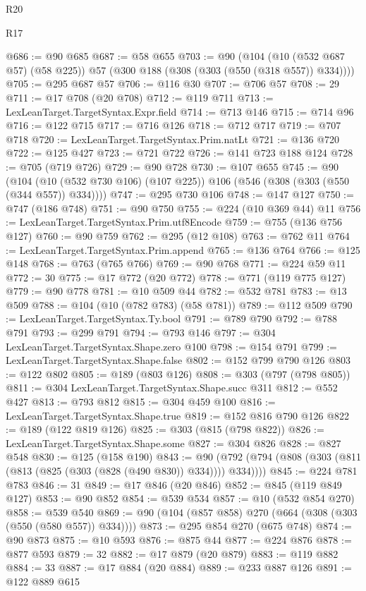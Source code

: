 \begin{lexlean}{R20}
\begin{lexlean}{R17}
\begin{coremodule}
{{{{{{{{{{{{{{{{{{{{{{{{{{{{{{{{{{{{{{{{{{{{{{{{{{{{{{{{{{{{{{{{{{{{{{{{{{{{{{{{{{{{{{{{{{{{{{{{{{{{{{{{{{{@686 := @90 @685
@687 := @58 @655
@703 := @90
    (@104 (@10 (@532 @687 @57) (@58 @225)) @57 (@300 @188 (@308 (@303 (@550 (@318 @557)) @334))))
@705 := @295 @687 @57
@706 := @116 @30
@707 := @706 @57
@708 := 29
@711 := @17 @708 (@20 @708)
@712 := @119 @711
@713 := LexLeanTarget.TargetSyntax.Expr.field
@714 := @713 @146
@715 := @714 @96
@716 := @122 @715
@717 := @716 @126
@718 := @712 @717
@719 := @707 @718
@720 := LexLeanTarget.TargetSyntax.Prim.natLt
@721 := @136 @720
@722 := @125 @427
@723 := @721 @722
@726 := @141 @723 @188 @124
@728 := @705 (@719 @726)
@729 := @90 @728
@730 := @107 @655
@745 := @90
    (@104 (@10 (@532 @730 @106) (@107 @225)) @106 (@546 (@308 (@303 (@550 (@344 @557)) @334))))
@747 := @295 @730 @106
@748 := @147 @127
@750 := @747 (@186 @748)
@751 := @90 @750
@755 := @224 (@10 @369 @44) @11
@756 := LexLeanTarget.TargetSyntax.Prim.utf8Encode
@759 := @755 (@136 @756 @127)
@760 := @90 @759
@762 := @295 (@12 @108)
@763 := @762 @11
@764 := LexLeanTarget.TargetSyntax.Prim.append
@765 := @136 @764
@766 := @125 @148
@768 := @763 (@765 @766)
@769 := @90 @768
@771 := @224 @59 @11
@772 := 30
@775 := @17 @772 (@20 @772)
@778 := @771 (@119 @775 @127)
@779 := @90 @778
@781 := @10 @509 @44
@782 := @532 @781
@783 := @13 @509
@788 := @104 (@10 (@782 @783) (@58 @781))
@789 := @112 @509
@790 := LexLeanTarget.TargetSyntax.Ty.bool
@791 := @789 @790
@792 := @788 @791
@793 := @299 @791
@794 := @793 @146
@797 := @304 LexLeanTarget.TargetSyntax.Shape.zero @100
@798 := @154 @791
@799 := LexLeanTarget.TargetSyntax.Shape.false
@802 := @152 @799 @790 @126
@803 := @122 @802
@805 := @189 (@803 @126)
@808 := @303 (@797 (@798 @805))
@811 := @304 LexLeanTarget.TargetSyntax.Shape.succ @311
@812 := @552 @427
@813 := @793 @812
@815 := @304 @459 @100
@816 := LexLeanTarget.TargetSyntax.Shape.true
@819 := @152 @816 @790 @126
@822 := @189 (@122 @819 @126)
@825 := @303 (@815 (@798 @822))
@826 := LexLeanTarget.TargetSyntax.Shape.some
@827 := @304 @826
@828 := @827 @548
@830 := @125 (@158 @190)
@843 := @90 (@792 (@794 (@808 (@303 (@811 (@813 (@825 (@303 (@828 (@490 @830)) @334)))) @334))))
@845 := @224 @781 @783
@846 := 31
@849 := @17 @846 (@20 @846)
@852 := @845 (@119 @849 @127)
@853 := @90 @852
@854 := @539 @534
@857 := @10 (@532 @854 @270)
@858 := @539 @540
@869 := @90 (@104 (@857 @858) @270 (@664 (@308 (@303 (@550 (@580 @557)) @334))))
@873 := @295 @854 @270 (@675 @748)
@874 := @90 @873
@875 := @10 @593
@876 := @875 @44
@877 := @224 @876
@878 := @877 @593
@879 := 32
@882 := @17 @879 (@20 @879)
@883 := @119 @882
@884 := 33
@887 := @17 @884 (@20 @884)
@889 := @233 @887 @126
@891 := @122 @889 @615
}}}}}}}}}}}}}}}}}}}}}}}}}}}}}}}}}}}}}}}}}}}}}}}}}}}}}}}}}}}}}}}}}}}}}}}}}}}}}}}}}}}}}}}}}}}}}}}}}}}}}}}}}}}
\end{coremodule}
\end{lexlean}
\end{lexlean}
